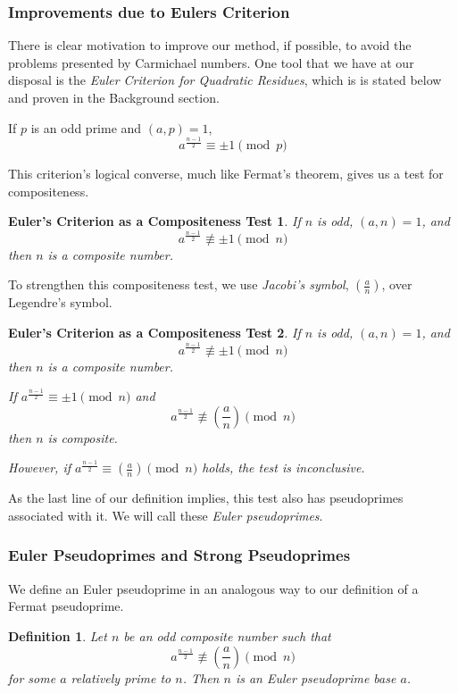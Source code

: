 \documentclass{article}
\newtheorem*{definition}{Definition}
\begin{document}
\subsubsection*{Improvements due to Eulers Criterion}

There is clear motivation to improve our method, if possible, to avoid the problems presented by Carmichael numbers. One tool that we have at our disposal is the \textit{Euler Criterion for Quadratic Residues}, which is is stated below and proven in the Background %
section.

\newtheorem*{eulerconverse}{Euler's Criterion as a Compositeness Test}

\begin{eulercriterion}
If $p$ is an odd prime and $(a,p) = 1$, 
$$a^{\frac{n-1}{2}} \equiv \pm 1 \pmod p$$
\end{eulercriterion}


This criterion's logical converse, much like Fermat's theorem, gives us a test for compositeness.
\begin{eulerconverse}
If $n$ is odd, $(a,n) = 1$, and
	$$a^{\frac{n-1}{2}} \not\equiv \pm 1 \pmod n$$
	then $n$ is a composite number.
\end{eulerconverse}

To strengthen this compositeness test, we use \textit{Jacobi's symbol}, $( \frac{a}{n})$, over Legendre's symbol.

\begin{eulerconverse}
If $n$ is odd, $(a,n) = 1$, and
	$$a^{\frac{n-1}{2}} \not\equiv \pm 1 \pmod n$$
	then $n$ is a composite number.
	
\par If $a^{\frac{n-1}{2}} \equiv \pm 1 \pmod n$ and
	$$a^{\frac{n-1}{2}} \not\equiv (\frac{a}{n}) \pmod n$$
	then $n$ is composite.
	
\par However, if $a^{\frac{n-1}{2}} \equiv (\frac{a}{n}) \pmod n$ holds, the test is inconclusive.
\end{eulerconverse}

As the last line of our definition implies, this test also has pseudoprimes associated with it. We will call these \textit{Euler pseudoprimes}.
\subsubsection*{Euler Pseudoprimes and Strong Pseudoprimes}
We define an Euler pseudoprime in an analogous way to our definition of a Fermat pseudoprime.
\begin{definition}
Let $n$ be an odd composite number such that
	 $$a^{\frac{n-1}{2}} \not\equiv (\frac{a}{n}) \pmod n$$ 
for some $a$ relatively prime to $n$.  Then $n$ is an \textit{Euler pseudoprime} base $a$.
\end{definition}
\end{document}
